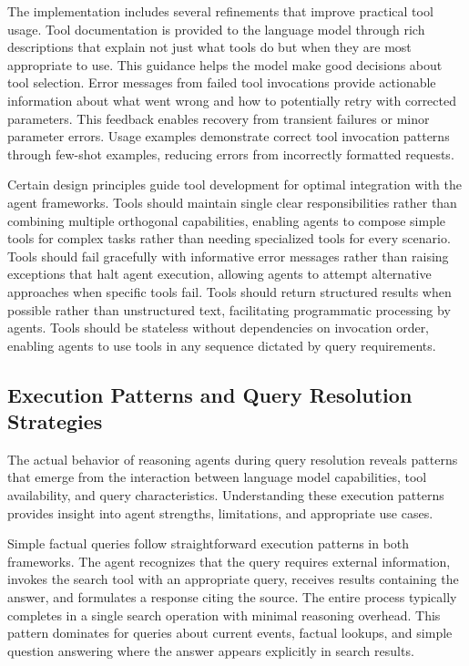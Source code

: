 The implementation includes several refinements that improve practical tool usage. Tool documentation is provided to the language model through rich descriptions that explain not just what tools do but when they are most appropriate to use. This guidance helps the model make good decisions about tool selection. Error messages from failed tool invocations provide actionable information about what went wrong and how to potentially retry with corrected parameters. This feedback enables recovery from transient failures or minor parameter errors. Usage examples demonstrate correct tool invocation patterns through few-shot examples, reducing errors from incorrectly formatted requests.

Certain design principles guide tool development for optimal integration with the agent frameworks. Tools should maintain single clear responsibilities rather than combining multiple orthogonal capabilities, enabling agents to compose simple tools for complex tasks rather than needing specialized tools for every scenario. Tools should fail gracefully with informative error messages rather than raising exceptions that halt agent execution, allowing agents to attempt alternative approaches when specific tools fail. Tools should return structured results when possible rather than unstructured text, facilitating programmatic processing by agents. Tools should be stateless without dependencies on invocation order, enabling agents to use tools in any sequence dictated by query requirements.

\subsection{Execution Patterns and Query Resolution Strategies}

The actual behavior of reasoning agents during query resolution reveals patterns that emerge from the interaction between language model capabilities, tool availability, and query characteristics. Understanding these execution patterns provides insight into agent strengths, limitations, and appropriate use cases.

Simple factual queries follow straightforward execution patterns in both frameworks. The agent recognizes that the query requires external information, invokes the search tool with an appropriate query, receives results containing the answer, and formulates a response citing the source. The entire process typically completes in a single search operation with minimal reasoning overhead. This pattern dominates for queries about current events, factual lookups, and simple question answering where the answer appears explicitly in search results.

